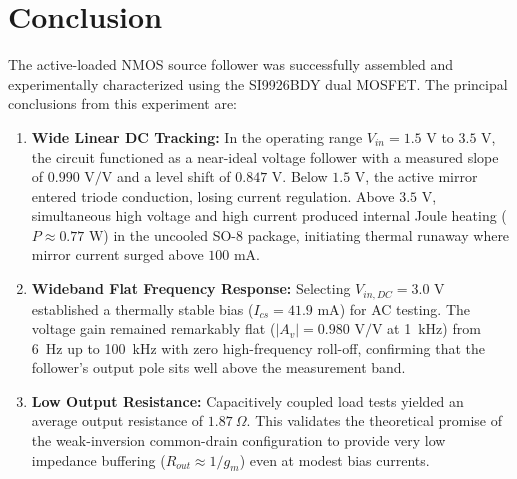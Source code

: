 \documentclass[11pt, a4paper]{article}
\begin{document}
\section{Conclusion}
The active-loaded NMOS source follower was successfully assembled and experimentally characterized using the SI9926BDY dual MOSFET. The principal conclusions from this experiment are:
\begin{enumerate}
    \item \textbf{Wide Linear DC Tracking:} In the operating range $V_{in} = 1.5\text{ V}$ to $3.5\text{ V}$, the circuit functioned as a near-ideal voltage follower with a measured slope of $0.990\text{ V/V}$ and a level shift of $0.847\text{ V}$. Below $1.5\text{ V}$, the active mirror entered triode conduction, losing current regulation. Above $3.5\text{ V}$, simultaneous high voltage and high current produced internal Joule heating ($P \approx 0.77\text{ W}$) in the uncooled SO-8 package, initiating thermal runaway where mirror current surged above $100\text{ mA}$.
    \item \textbf{Wideband Flat Frequency Response:} Selecting $V_{in,DC} = 3.0\text{ V}$ established a thermally stable bias ($I_{cs} = 41.9\text{ mA}$) for AC testing. The voltage gain remained remarkably flat ($|A_v| = 0.980\text{ V/V}$ at 1~kHz) from 6~Hz up to 100~kHz with zero high-frequency roll-off, confirming that the follower's output pole sits well above the measurement band.
    \item \textbf{Low Output Resistance:} Capacitively coupled load tests yielded an average output resistance of $1.87\ \Omega$. This validates the theoretical promise of the weak-inversion common-drain configuration to provide very low impedance buffering ($R_{out} \approx 1/g_m$) even at modest bias currents.
\end{enumerate}
\end{document}
